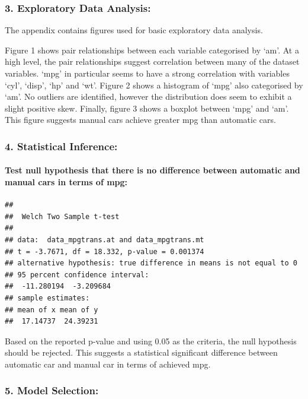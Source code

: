 \documentclass[]{article}
\begin{document}
\subsubsection{3. Exploratory Data
Analysis:}\label{exploratory-data-analysis}

The appendix contains figures used for basic exploratory data analysis.

Figure 1 shows pair relationships between each variable categorised by
`am'. At a high level, the pair relationships suggest correlation
between many of the dataset variables. `mpg' in particular seems to have
a strong correlation with variables `cyl', `disp', `hp' and `wt'. Figure
2 shows a histogram of `mpg' also categorised by `am'. No outliers are
identified, however the distribution does seem to exhibit a slight
positive skew. Finally, figure 3 shows a boxplot between `mpg' and `am'.
This figure suggests manual cars achieve greater mpg than automatic
cars.

\subsubsection{4. Statistical Inference:}\label{statistical-inference}

\paragraph{Test null hypothesis that there is no difference between
automatic and manual cars in terms of
mpg:}\label{test-null-hypothesis-that-there-is-no-difference-between-automatic-and-manual-cars-in-terms-of-mpg}

\begin{verbatim}
## 
##  Welch Two Sample t-test
## 
## data:  data_mpgtrans.at and data_mpgtrans.mt
## t = -3.7671, df = 18.332, p-value = 0.001374
## alternative hypothesis: true difference in means is not equal to 0
## 95 percent confidence interval:
##  -11.280194  -3.209684
## sample estimates:
## mean of x mean of y 
##  17.14737  24.39231
\end{verbatim}

Based on the reported p-value and using 0.05 as the criteria, the null
hypothesis should be rejected. This suggests a statistical significant
difference between automatic car and manual car in terms of achieved
mpg.

\subsubsection{5. Model Selection:}\label{model-selection}
\end{document}
